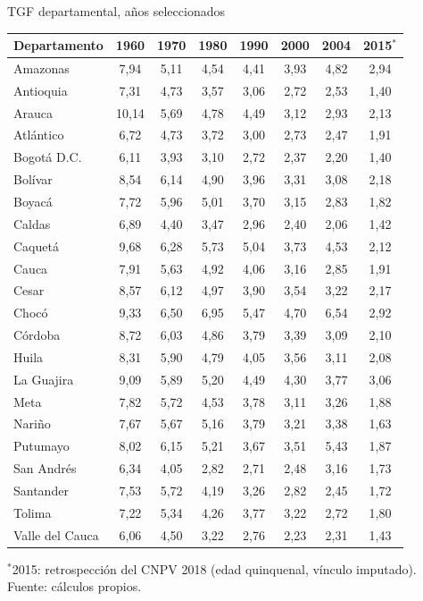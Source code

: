 \documentclass[11pt,aspectratio=169]{beamer}
\begin{document}
\begin{frame}{TGF departamental, a\~nos seleccionados}
\begin{center}
{\tiny\begin{tabular}{lccccccc}\toprule
Departamento & 1960 & 1970 & 1980 & 1990 & 2000 & 2004 & 2015$^{*}$ \\ \midrule
Amazonas & 7{,}94 & 5{,}11 & 4{,}54 & 4{,}41 & 3{,}93 & 4{,}82 & 2{,}94 \\
Antioquia & 7{,}31 & 4{,}73 & 3{,}57 & 3{,}06 & 2{,}72 & 2{,}53 & 1{,}40 \\
Arauca & 10{,}14 & 5{,}69 & 4{,}78 & 4{,}49 & 3{,}12 & 2{,}93 & 2{,}13 \\
Atlántico & 6{,}72 & 4{,}73 & 3{,}72 & 3{,}00 & 2{,}73 & 2{,}47 & 1{,}91 \\
Bogotá D.C. & 6{,}11 & 3{,}93 & 3{,}10 & 2{,}72 & 2{,}37 & 2{,}20 & 1{,}40 \\
Bolívar & 8{,}54 & 6{,}14 & 4{,}90 & 3{,}96 & 3{,}31 & 3{,}08 & 2{,}18 \\
Boyacá & 7{,}72 & 5{,}96 & 5{,}01 & 3{,}70 & 3{,}15 & 2{,}83 & 1{,}82 \\
Caldas & 6{,}89 & 4{,}40 & 3{,}47 & 2{,}96 & 2{,}40 & 2{,}06 & 1{,}42 \\
Caquetá & 9{,}68 & 6{,}28 & 5{,}73 & 5{,}04 & 3{,}73 & 4{,}53 & 2{,}12 \\
Cauca & 7{,}91 & 5{,}63 & 4{,}92 & 4{,}06 & 3{,}16 & 2{,}85 & 1{,}91 \\
Cesar & 8{,}57 & 6{,}12 & 4{,}97 & 3{,}90 & 3{,}54 & 3{,}22 & 2{,}17 \\
Chocó & 9{,}33 & 6{,}50 & 6{,}95 & 5{,}47 & 4{,}70 & 6{,}54 & 2{,}92 \\
Córdoba & 8{,}72 & 6{,}03 & 4{,}86 & 3{,}79 & 3{,}39 & 3{,}09 & 2{,}10 \\
Huila & 8{,}31 & 5{,}90 & 4{,}79 & 4{,}05 & 3{,}56 & 3{,}11 & 2{,}08 \\
La Guajira & 9{,}09 & 5{,}89 & 5{,}20 & 4{,}49 & 4{,}30 & 3{,}77 & 3{,}06 \\
Meta & 7{,}82 & 5{,}72 & 4{,}53 & 3{,}78 & 3{,}11 & 3{,}26 & 1{,}88 \\
Nariño & 7{,}67 & 5{,}67 & 5{,}16 & 3{,}79 & 3{,}21 & 3{,}38 & 1{,}63 \\
Putumayo & 8{,}02 & 6{,}15 & 5{,}21 & 3{,}67 & 3{,}51 & 5{,}43 & 1{,}87 \\
San Andrés & 6{,}34 & 4{,}05 & 2{,}82 & 2{,}71 & 2{,}48 & 3{,}16 & 1{,}73 \\
Santander & 7{,}53 & 5{,}72 & 4{,}19 & 3{,}26 & 2{,}82 & 2{,}45 & 1{,}72 \\
Tolima & 7{,}22 & 5{,}34 & 4{,}26 & 3{,}77 & 3{,}22 & 2{,}72 & 1{,}80 \\
Valle del Cauca & 6{,}06 & 4{,}50 & 3{,}22 & 2{,}76 & 2{,}23 & 2{,}31 & 1{,}43 \\
\bottomrule\end{tabular}}
\end{center}
{\scriptsize $^{*}$2015: retrospecci\'on del CNPV 2018 (edad quinquenal,
v\'inculo imputado). Fuente: c\'alculos propios.}
\end{frame}
\end{document}
